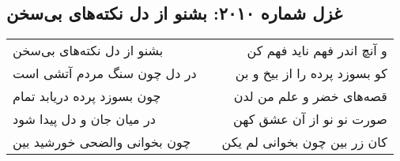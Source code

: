 \begin{center}
\section*{غزل شماره ۲۰۱۰: بشنو از دل نکته‌های بی‌سخن}
\label{sec:2010}
\begin{longtable}{l p{0.5cm} r}
بشنو از دل نکته‌های بی‌سخن
&&
و آنچ اندر فهم ناید فهم کن
\\
در دل چون سنگ مردم آتشی است
&&
کو بسوزد پرده را از بیخ و بن
\\
چون بسوزد پرده دریابد تمام
&&
قصه‌های خضر و علم من لدن
\\
در میان جان و دل پیدا شود
&&
صورت نو نو از آن عشق کهن
\\
چون بخوانی والضحی خورشید بین
&&
کان زر بین چون بخوانی لم یکن
\\
\end{longtable}
\end{center}

